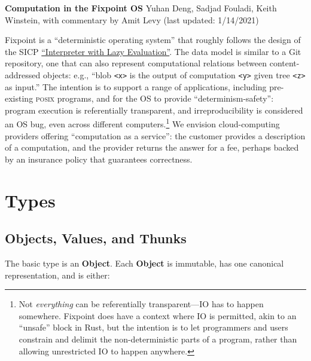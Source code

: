 \documentclass{article}
\newcommand{\valuexs}{\textbf{Value}s\xspace}
\newcommand{\object}{\textbf{Object}\xspace}
\newcommand{\objects}{\textbf{Object}s\xspace}
\newcommand{\thunks}{\textbf{Thunk}s\xspace}
\newcommand{\bs}{\vspace{\baselineskip}}
\begin{document}

\textbf{Computation in the Fixpoint OS}\newline
Yuhan Deng, Sadjad Fouladi, Keith Winstein, with commentary by Amit Levy (last updated: 1/14/2021)

\bs

Fixpoint is a ``deterministic operating system'' that roughly follows
the design of the SICP
\href{https://mitpress.mit.edu/sites/default/files/sicp/full-text/book/book-Z-H-27.html#\%_sec_4.2.2}{``Interpreter
  with Lazy Evaluation''}. The data model is similar to a Git
repository, one that can also represent computational relations
between content-addressed objects: e.g., ``blob \texttt{<x>} is the
output of computation \texttt{<y>} given tree \texttt{<z>} as input.''
The intention is to support a range of applications, including
pre-existing \textsc{posix} programs, and for the OS to provide
``determinism-safety'': program execution is referentially
transparent, and irreproducibility is considered an OS bug, even
across different computers.\footnote{Not \emph{everything} can be
referentially transparent---IO has to happen somewhere. Fixpoint does have a
context where IO is permitted, akin to an ``unsafe'' block in Rust,
but the intention is to let programmers and users constrain and
delimit the non-deterministic parts of a program, rather than allowing
unrestricted IO to happen anywhere.} We envision cloud-computing
providers offering ``computation as a service'': the customer provides
a description of a computation, and the provider returns the answer
for a fee, perhaps backed by an insurance policy that guarantees
correctness.


\section{Types}

\subsection{\objects, \valuexs, and \thunks}

The basic type is an \object. Each \object is immutable, has one canonical representation, and is either:
\end{document}
